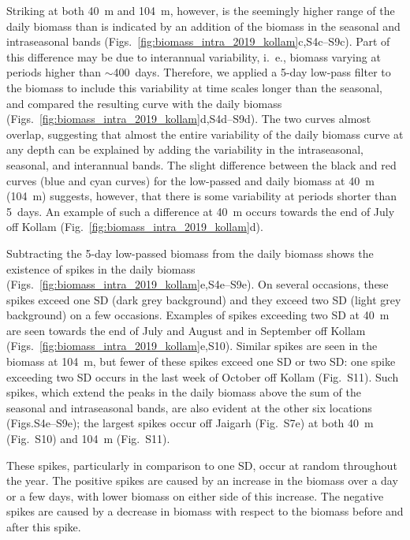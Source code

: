 \documentclass[authoryear,review,11pt]{elsarticle}
\begin{document}
Striking at both 40~m and 104~m, however, is the seemingly higher range of the daily biomass than is indicated by an addition of the biomass in the seasonal and intraseasonal bands (Figs.~\ref{fig:biomass_intra_2019_kollam}c,S4c--S9c). Part of this difference may be due to interannual variability, i.~e., biomass varying at periods higher than $\sim$400~days.  Therefore, we applied a 5-day low-pass filter to the biomass to include this variability at time scales longer than the seasonal, and compared the resulting curve with the daily biomass (Figs.~\ref{fig:biomass_intra_2019_kollam}d,S4d--S9d).  The two curves almost overlap, suggesting that almost the entire variability of the daily biomass curve at any depth can be explained by adding the variability in the intraseasonal, seasonal, and interannual bands. The slight difference between the black and red curves (blue and cyan curves) for the low-passed and daily biomass at 40~m (104~m) suggests, however, that there is some variability at periods shorter than 5~days.  An example of such a difference at 40~m occurs towards the end of July off Kollam (Fig.~\ref{fig:biomass_intra_2019_kollam}d).

Subtracting the 5-day low-passed biomass from the daily biomass shows the existence of spikes in the daily biomass (Figs.~\ref{fig:biomass_intra_2019_kollam}e,S4e--S9e).  On several occasions, these spikes exceed one SD (dark grey background) and they exceed two SD (light grey background) on a few occasions.  Examples of spikes exceeding two SD at 40~m are seen towards the end of July and August and in September off Kollam (Figs.~\ref{fig:biomass_intra_2019_kollam}e,S10). Similar spikes are seen in the biomass at 104~m, but fewer of these spikes exceed one SD or two SD: one spike exceeding two SD occurs in the last week of October off Kollam (Fig.~S11). Such spikes, which extend the peaks in the daily biomass above the sum of the seasonal and intraseasonal bands, are also evident at the other six locations (Figs.S4e--S9e); the largest spikes occur off Jaigarh (Fig.~S7e) at both 40~m (Fig.~S10) and 104~m (Fig.~S11).  

These spikes, particularly in comparison to one SD, occur at random throughout the year. The positive spikes are caused by an increase in the biomass over a day or a few days, with lower biomass on either side of this increase. The negative spikes are caused by a decrease in biomass with respect to the biomass before and after this spike.

\end{document}

